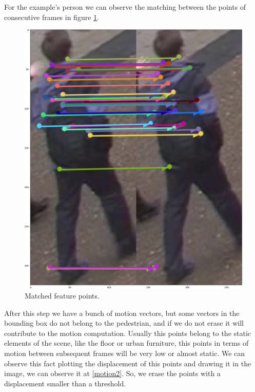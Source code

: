 For the example's person we can observe the matching between the points of consecutive frames in figure \ref{solution4}.

\begin{figure}[hptb]
\centering         
\includegraphics[width=0.3\linewidth]{implementation/matching.png}
\caption{Matched feature points.} \label{solution4}
\end{figure}



After this step we have a bunch of motion vectors, but some vectors in the bounding box do not belong to the pedestrian, and if we do not erase it will contribute to the motion computation. Usually this points belong to the static elements of the scene, like the floor or urban furniture, this points in terms of motion between subsequent frames will be very low or almost static. We can observe this fact plotting the displacement of this points and drawing it in the image, we can observe it at \ref{motion2}. So, we erase the points with a displacement smaller than a threshold. 

